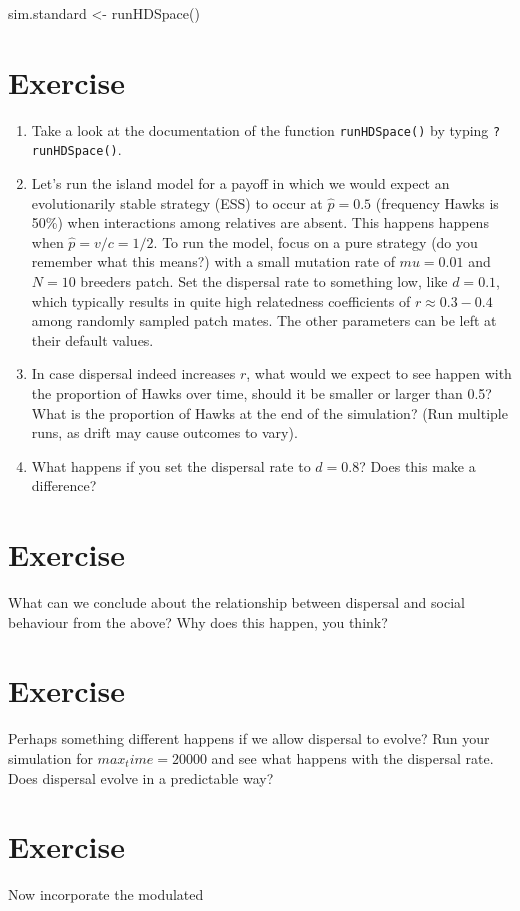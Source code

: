 \documentclass[
]{book}
\newenvironment{Shaded}{\begin{snugshade}}{\end{snugshade}}
\newcommand{\FunctionTok}[1]{\textcolor[rgb]{0.00,0.00,0.00}{#1}}
\newcommand{\NormalTok}[1]{#1}
\newcommand{\OtherTok}[1]{\textcolor[rgb]{0.56,0.35,0.01}{#1}}
\begin{document}
\begin{Shaded}
\begin{Highlighting}[]
\NormalTok{sim.standard }\OtherTok{\textless{}{-}} \FunctionTok{runHDSpace}\NormalTok{() }
\end{Highlighting}
\end{Shaded}

\hypertarget{exercise-13}{%
\section{Exercise}\label{exercise-13}}

\begin{enumerate}
\def\labelenumi{\arabic{enumi}.}
\item
  Take a look at the documentation of the function \texttt{runHDSpace()} by typing \texttt{?runHDSpace()}.
\item
  Let's run the island model for a payoff in which we would expect an evolutionarily stable strategy (ESS) to occur at \(\hat{p}=0.5\) (frequency Hawks is 50\%) when interactions among relatives are absent. This happens happens when \(\hat{p} = v/c = 1/2\). To run the model, focus on a pure strategy (do you remember what this means?) with a small mutation rate of \(mu=0.01\) and \(N=10\) breeders patch. Set the dispersal rate to something low, like \(d=0.1\), which typically results in quite high relatedness coefficients of \(r\approx 0.3-0.4\) among randomly sampled patch mates. The other parameters can be left at their default values.
\item
  In case dispersal indeed increases \(r\), what would we expect to see happen with the proportion of Hawks over time, should it be smaller or larger than 0.5? What is the proportion of Hawks at the end of the simulation? (Run multiple runs, as drift may cause outcomes to vary).
\item
  What happens if you set the dispersal rate to \(d=0.8\)? Does this make a difference?
\end{enumerate}

\hypertarget{exercise-14}{%
\section{Exercise}\label{exercise-14}}

What can we conclude about the relationship between dispersal and social behaviour from the above? Why does this happen, you think?

\hypertarget{exercise-15}{%
\section{Exercise}\label{exercise-15}}

Perhaps something different happens if we allow dispersal to evolve? Run your simulation for \(max_time = 20000\) and see what happens with the dispersal rate. Does dispersal evolve in a predictable way?

\hypertarget{exercise-16}{%
\section{Exercise}\label{exercise-16}}

Now incorporate the modulated
\end{document}
